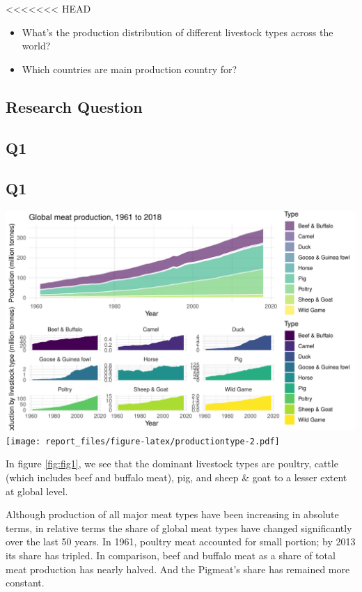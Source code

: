 \documentclass[11pt,a4paper,]{article}
\begin{document}
<<<<<<< HEAD
\begin{itemize}
\item
  What's the production distribution of different livestock types across the world?
\item
  Which countries are main production country for?
\end{itemize}

\subsection*{Research Question}

\hypertarget{q1}{%
\subsection{Q1}\label{q1}}

\hypertarget{q1-1}{%
\subsection{Q1}\label{q1-1}}

\includegraphics{report_files/figure-latex/productiontype-1.pdf} \texttt{[image: report\_files/figure-latex/productiontype-2.pdf]}

In figure \ref{fig:fig1}, we see that the dominant livestock types are poultry, cattle (which includes beef and buffalo meat), pig, and sheep \& goat to a lesser extent at global level.

Although production of all major meat types have been increasing in absolute terms, in relative terms the share of global meat types have changed significantly over the last 50 years. In 1961, poultry meat accounted for small portion; by 2013 its share has tripled. In comparison, beef and buffalo meat as a share of total meat production has nearly halved. And the Pigmeat's share has remained more constant.
\end{document}
